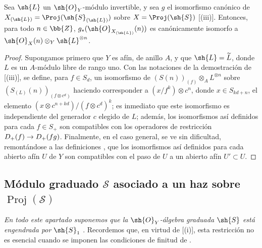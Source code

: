 \documentclass[oneside,10pt]{amsart}
\makeatletter
\newcommand{\ega@arrow}[2]{\mathchoice{#1}{#2}{#2}{#2}}
\renewcommand{\to}{\ega@arrow{\longrightarrow}{\rightarrow}}
\let\EGAOriginalLabel\label
\renewcommand{\label}[1]{\phantomsection\EGAOriginalLabel{#1}}
\makeatother
\begin{document}
\begin{proposition}[3.2.10]
\label{II.3.2.10}
Sea $\sh{L}$ un $\sh{O}_Y$-módulo invertible, y sea $g$ el isomorfismo canónico de $X_{(\sh{L})}=\Proj(\sh{S}_{(\sh{L})})$ sobre $X=\Proj(\sh{S})$ [(iii)].
Entonces, para todo $n\in\bb{Z}$, $g_*(\sh{O}_{X_{(\sh{L})}}(n))$ es canónicamente isomorfo a $\sh{O}_X(n)\otimes_Y\sh{L}^{\otimes n}$.
\end{proposition}

\begin{proof}
Supongamos primero que $Y$ es afín, de anillo $A$, y que $\sh{L}=\widetilde{L}$, donde $L$ es un $A$-módulo libre de rango uno.
Con las notaciones de la demostración de [(iii)], se define, para $f\in S_d$, un isomorfismo de $(S(n))_{(f)}\otimes_A L^{\otimes n}$ sobre $(S_{(L)}(n))_{(f\otimes c^d)}$ haciendo corresponder a $(x/f^k)\otimes c^n$, donde $x\in S_{kd+n}$, el elemento $(x\otimes c^{n+kd})/(f\otimes c^d)^k$; es inmediato que este isomorfismo es independiente del generador $c$ elegido de $L$; además, los isomorfismos así definidos para cada $f\in S_+$ son compatibles con los operadores de restricción $D_+(f)\to D_+(fg)$.
Finalmente, en el caso general, se ve sin dificultad, remontándose a las definiciones , que los isomorfismos así definidos para cada abierto afín $U$ de $Y$ son compatibles con el paso de $U$ a un abierto afín $U'\subset U$.
\end{proof}

\subsection{Módulo graduado $\mathcal{S}$ asociado a un haz sobre $\operatorname{Proj}(\mathcal{S})$}
\label{subsection:II.3.3}

\emph{En todo este apartado suponemos que la $\sh{O}_Y$-álgebra graduada $\sh{S}$ está engendrada por $\sh{S}_1$} .
Recordemos que, en virtud de [(i)], esta restricción no es esencial cuando se imponen las condiciones de finitud de .
\end{document}
